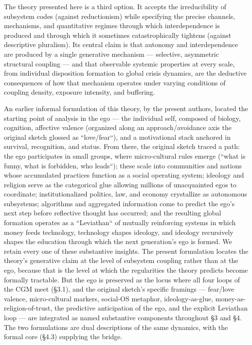 \documentclass[12pt,a4paper]{article}
\begin{document}
The theory presented here is a third option. It accepts the irreducibility of subsystem codes (against reductionism) while specifying the precise channels, mechanisms, and quantitative regimes through which interdependence is produced and through which it sometimes catastrophically tightens (against descriptive pluralism). Its central claim is that autonomy and interdependence are produced by a single generative mechanism --- selective, asymmetric structural coupling --- and that observable systemic properties at every scale, from individual disposition formation to global crisis dynamics, are the deductive consequences of how that mechanism operates under varying conditions of coupling density, exposure intensity, and buffering.


An earlier informal formulation of this theory, by the present authors, located the starting point of analysis in the ego --- the individual self, composed of biology, cognition, affective valence (organized along an approach/avoidance axis the original sketch glossed as ``love/fear``), and a motivational stack anchored in survival, recognition, and status. From there, the original sketch traced a path: the ego participates in small groups, where micro-cultural rules emerge (``what is funny, what is forbidden, who leads``); these scale into communities and nations whose accumulated practices function as a social operating system; ideology and religion serve as the categorical glue allowing millions of unacquainted egos to coordinate; institutionalized politics, law, and economy crystallize as autonomous subsystems; algorithms and aggregated information come to predict the ego's next step before reflective thought has occurred; and the resulting global formation operates as a ``Leviathan`` of mutually reinforcing systems in which money feeds technology, technology shapes ideology, and ideology recursively shapes the education through which the next generation's ego is formed. We retain every one of these substantive insights. The present formulation locates the theory's generative claim at the level of subsystem coupling rather than at the ego, because that is the level at which the regularities the theory predicts become formally tractable. But the ego is preserved as the locus where all four loops of the CGM meet (§3.1), and the original sketch's specific framings --- fear/love valence, micro-cultural markers, social-OS metaphor, ideology-as-glue, money-as-religion-of-trust, the predictive anticipation of the ego, and the explicit Leviathan loop --- are integrated as named substantive components throughout §3 and §4. The two formulations are dual descriptions of the same dynamics, with the formal core (§4.3) supplying the bridge.
\end{document}
